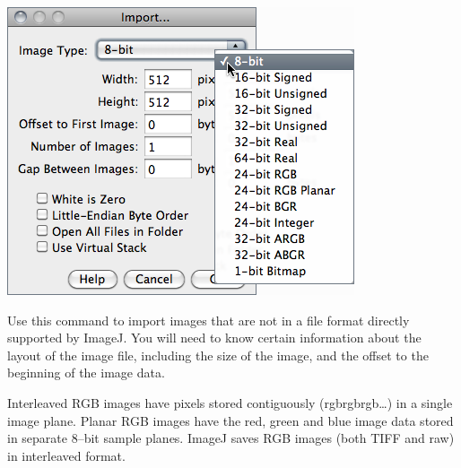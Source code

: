 \begin{minipage}[c][1\totalheight][t]{0.53\columnwidth}%
\includegraphics[scale=0.55]{images/ImportRaw}%
\end{minipage}%
\begin{minipage}[c][1\totalheight][t]{0.47\columnwidth}%
Use this command to import images that are not in a file format directly
supported by ImageJ. You will need to know certain information about
the layout of the image file, including the size of the image, and
the offset to the beginning of the image data.\medskip{}


\noindent Interleaved RGB images have pixels stored contiguously (rgbrgbrgb\ldots{})
in a single image plane. Planar RGB images have the red, green and
blue image data stored in separate 8--bit sample planes. ImageJ saves
RGB images (both TIFF and raw) in interleaved format.%
\end{minipage}
